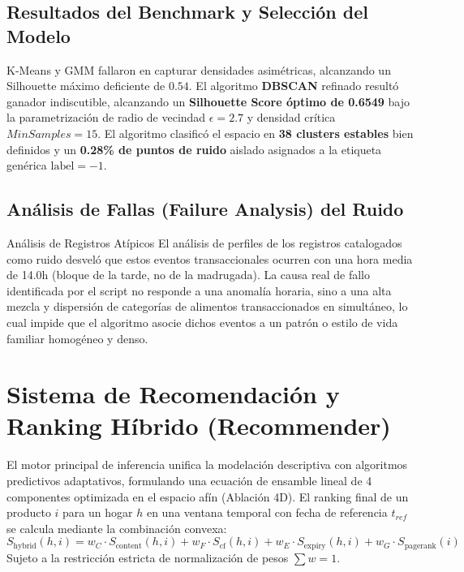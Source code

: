 \documentclass[11pt,a4paper]{article}
\begin{document}
\subsection{Resultados del Benchmark y Selección del Modelo}
K-Means y GMM fallaron en capturar densidades asimétricas, alcanzando un Silhouette máximo deficiente de $0.54$. El algoritmo \textbf{DBSCAN} refinado resultó ganador indiscutible, alcanzando un \textbf{Silhouette Score óptimo de 0.6549} bajo la parametrización de radio de vecindad $\epsilon = 2.7$ y densidad crítica $MinSamples = 15$. El algoritmo clasificó el espacio en \textbf{38 clusters estables} bien definidos y un \textbf{0.28\% de puntos de ruido} aislado asignados a la etiqueta genérica $\text{label} = -1$.

\subsection{Análisis de Fallas (Failure Analysis) del Ruido}
\begin{techbox}{Análisis de Registros Atípicos}
El análisis de perfiles de los registros catalogados como ruido desveló que estos eventos transaccionales ocurren con una hora media de 14.0h (bloque de la tarde, no de la madrugada). La causa real de fallo identificada por el script no responde a una anomalía horaria, sino a una alta mezcla y dispersión de categorías de alimentos transaccionados en simultáneo, lo cual impide que el algoritmo asocie dichos eventos a un patrón o estilo de vida familiar homogéneo y denso.
\end{techbox}

\section{Sistema de Recomendación y Ranking Híbrido (Recommender)}
El motor principal de inferencia unifica la modelación descriptiva con algoritmos predictivos adaptativos, formulando una ecuación de ensamble lineal de 4 componentes optimizada en el espacio afín (Ablación 4D). El ranking final de un producto $i$ para un hogar $h$ en una ventana temporal con fecha de referencia $t_{ref}$ se calcula mediante la combinación convexa:
\begin{equation}
S_{\text{hybrid}}(h, i) = w_C \cdot S_{\text{content}}(h, i) + w_F \cdot S_{\text{cf}}(h, i) + w_E \cdot S_{\text{expiry}}(h, i) + w_G \cdot S_{\text{pagerank}}(i)
\end{equation}
Sujeto a la restricción estricta de normalización de pesos $\sum w = 1$.
\end{document}
